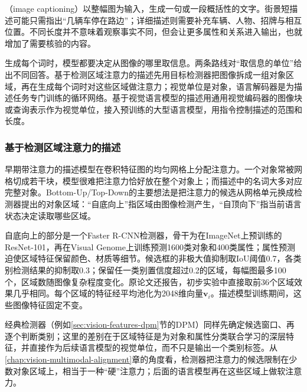 （image captioning）以整幅图为输入，生成一句或一段概括性的文字。街景短描述可能只需指出“几辆车停在路边”；详细描述则需要补充车辆、人物、招牌与相互位置。不同长度并不意味着观察事实不同，但会让更多属性和关系进入输出，也就增加了需要核验的内容。

生成每个词时，模型都要决定从图像的哪里取信息。两条路线对“取信息的单位”给出不同回答。基于检测区域注意力的描述先用目标检测器把图像拆成一组对象区域，再在生成每个词时对这些区域做注意力；视觉单位是对象，语言解码器是为描述任务专门训练的循环网络。基于视觉语言模型的描述用通用视觉编码器的图像块或查询表示作为视觉单位，接入预训练的大型语言模型，用指令控制描述的范围和长度。

\subsubsection{基于检测区域注意力的描述}
\label{sec:vision-understanding-bottomup}

早期带注意力的描述模型在卷积特征图的均匀网格上分配注意力。一个对象常被网格切成若干块，模型很难把注意力恰好放在整个对象上；而描述中的名词大多对应完整对象。Bottom-Up/Top-Down的主要想法是把注意力的候选从网格单元换成检测器提出的对象区域：“自底向上”指区域由图像检测产生，“自顶向下”指当前语言状态决定读取哪些区域。

自底向上的部分是一个Faster R-CNN检测器，骨干为在ImageNet上预训练的ResNet-101，再在Visual Genome上训练预测1600类对象和400类属性；属性预测迫使区域特征保留颜色、材质等细节。候选框的非极大值抑制取IoU阈值0.7，各类别检测结果的抑制取0.3；保留任一类别置信度超过0.2的区域，每幅图最多100个，区域数随图像复杂程度变化。原论文还报告，初步实验中直接取前36个区域效果几乎相同。每个区域的特征经平均池化为2048维向量$\bm v_i$。描述模型训练期间，这些图像特征固定不变。

经典检测器（例如\ref{sec:vision-features-dpm}节的DPM）同样先确定候选窗口、再逐个判断类别；这里的差别在于区域特征是为对象和属性分类联合学习的深层特征，并直接作为后续语言模型的视觉单位，而不只是输出一个类别标签。从\ref{chap:vision-multimodal-alignment}章的角度看，检测器把注意力的候选限制在少数对象区域上，相当于一种“硬”注意力；后面的语言模型再在这些区域上做软注意力。

